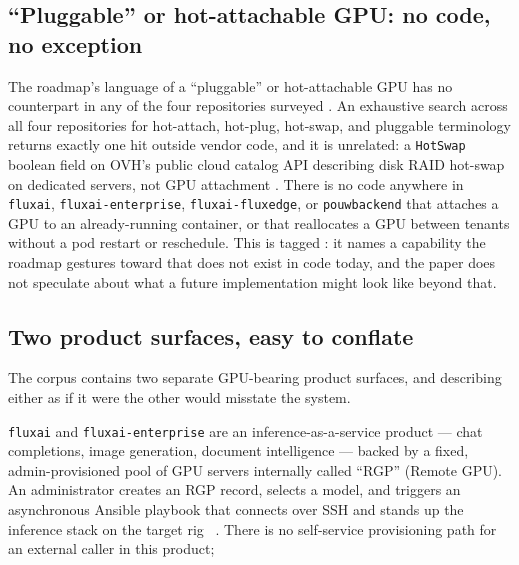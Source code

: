 \subsection{``Pluggable'' or hot-attachable GPU: no code, no exception}
\label{sec:accelerated-compute-pluggable}

The roadmap's language of a ``pluggable'' or hot-attachable GPU has no counterpart in any of the
four repositories surveyed . An exhaustive search across all four
repositories for hot-attach, hot-plug, hot-swap, and pluggable terminology returns exactly one hit
outside vendor code, and it is unrelated: a \texttt{HotSwap} boolean field on OVH's public cloud
catalog API describing disk RAID hot-swap on dedicated servers, not GPU attachment
. There is no code anywhere in \texttt{fluxai},
\texttt{fluxai-\allowbreak{}enterprise}, \texttt{fluxai-\allowbreak{}fluxedge}, or \texttt{pouwbackend} that attaches a GPU to
an already-running container, or that reallocates a GPU between tenants without a pod
restart or reschedule. This is tagged \vision: it names a capability the roadmap gestures toward
that does not exist in code today, and the paper does not speculate about what a future
implementation might look like beyond that.

\subsection{Two product surfaces, easy to conflate}
\label{sec:accelerated-compute-surfaces}

The corpus contains two separate GPU-bearing product surfaces, and describing either as if it were
the other would misstate the system.

\texttt{fluxai} and \texttt{fluxai-\allowbreak{}enterprise} are an inference-as-a-service product — chat
completions, image generation, document intelligence — backed by a fixed, admin-provisioned pool of
GPU servers internally called ``RGP'' (Remote GPU). An administrator creates an RGP record, selects a
model, and triggers an asynchronous Ansible playbook that connects over SSH and stands up the
inference stack on the target rig \shipped\ .
There is no self-service provisioning path for an external caller in this product; 

